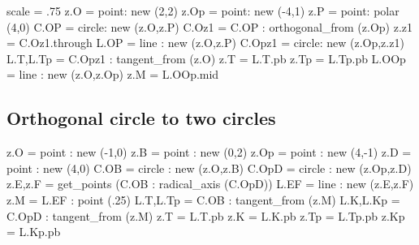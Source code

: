 \begin{tkzelements}
scale = .75
z.O      = point: new (2,2)
z.Op     = point: new (-4,1)
z.P      = point: polar (4,0)
C.OP     = circle: new (z.O,z.P)
C.Oz1    =  C.OP : orthogonal_from (z.Op)
z.z1     = C.Oz1.through
L.OP     = line : new (z.O,z.P)
C.Opz1   = circle: new (z.Op,z.z1)
L.T,L.Tp = C.Opz1 : tangent_from (z.O)
z.T      = L.T.pb
z.Tp     = L.Tp.pb
L.OOp    = line : new (z.O,z.Op)
z.M      = L.OOp.mid
\end{tkzelements}

\hspace*{\fill}
\hspace*{\fill}
%
\subsection{Orthogonal circle to two circles} %
\label{sub:orthogonal_circle_to_two_circles}

\begin{tkzexample}[latex=0cm,small,code only]
\begin{tkzelements}
   z.O         = point :   new (-1,0)
   z.B         = point :   new (0,2)
   z.Op        = point :   new (4,-1)
   z.D         = point :   new (4,0)
   C.OB        = circle :  new (z.O,z.B)
   C.OpD       = circle :  new (z.Op,z.D)
   z.E,z.F     = get_points (C.OB : radical_axis (C.OpD))
   L.EF        = line : new (z.E,z.F)
   z.M         = L.EF : point (.25)
   L.T,L.Tp    = C.OB : tangent_from (z.M)
   L.K,L.Kp    = C.OpD : tangent_from (z.M)
   z.T         = L.T.pb
   z.K         = L.K.pb
   z.Tp        = L.Tp.pb
   z.Kp        = L.Kp.pb
\end{tkzelements}
\end{tkzexample}

